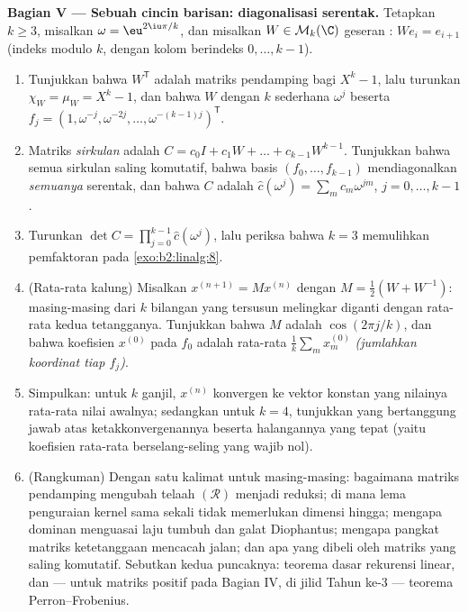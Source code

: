 \begin{problem}
\medskip
\noindent\textbf{Bagian V --- Sebuah cincin barisan: diagonalisasi
serentak.} Tetapkan $k \geq 3$, misalkan $\omega = \eu^{2\iu\pi/k}$,
dan misalkan $W \in \mathcal{M}_k(\C)$ geseran : $W e_i =
e_{i+1}$ (indeks modulo $k$, dengan kolom berindeks $0, \dots, k-1$).
\begin{enumerate}[resume]
  \item Tunjukkan bahwa $W^{\mathsf T}$ adalah matriks pendamping bagi
        $X^k - 1$, lalu turunkan $\chi_W = \mu_W = X^k - 1$, dan bahwa $W$
         dengan $k$  sederhana
        $\omega^j$ beserta  $f_j = (1, \omega^{-j},
        \omega^{-2j}, \dots, \omega^{-(k-1)j})^{\mathsf T}$.
  \item Matriks \emph{sirkulan} adalah $C = c_0 I + c_1 W + \dots
        + c_{k-1}W^{k-1}$. Tunjukkan bahwa semua sirkulan saling
        komutatif, bahwa basis $(f_0, \dots, f_{k-1})$ mendiagonalkan
        \emph{semuanya} serentak, dan bahwa
         $C$ adalah $\widehat c(\omega^j) = \sum_m
        c_m \omega^{jm}$, $j = 0, \dots, k-1$.
  \item Turunkan $\det C = \prod_{j=0}^{k-1} \widehat
        c(\omega^j)$, lalu periksa bahwa $k = 3$ memulihkan
        pemfaktoran pada \cref{exo:b2:linalg:8}.
  \item (Rata-rata kalung) Misalkan $x^{(n+1)} = Mx^{(n)}$ dengan
        $M = \frac12(W + W^{-1})$: masing-masing dari $k$ bilangan yang
        tersusun melingkar diganti dengan rata-rata kedua
        tetangganya. Tunjukkan bahwa  $M$ adalah
        $\cos(2\pi j/k)$, dan bahwa koefisien $x^{(0)}$
        pada $f_0$ adalah rata-rata $\frac1k\sum_m x^{(0)}_m$
        \emph{(jumlahkan koordinat tiap $f_j$)}.
  \item Simpulkan: untuk $k$ ganjil, $x^{(n)}$ konvergen ke
        vektor konstan yang nilainya rata-rata nilai awalnya;
        sedangkan untuk $k = 4$, tunjukkan  yang
        bertanggung jawab atas ketakkonvergenannya beserta halangannya
        yang tepat (yaitu koefisien rata-rata berselang-seling yang wajib nol).
  \item (Rangkuman) Dengan satu kalimat untuk masing-masing: bagaimana
        matriks pendamping mengubah telaah $(\mathcal R)$ menjadi
        reduksi; di mana lema penguraian kernel sama sekali
        tidak memerlukan dimensi hingga; mengapa  dominan
        menguasai laju tumbuh dan galat Diophantus; mengapa pangkat
        matriks ketetanggaan mencacah jalan; dan apa yang dibeli oleh
        matriks yang saling komutatif. Sebutkan kedua puncaknya: teorema
        dasar rekurensi linear, dan --- untuk matriks positif
        pada Bagian IV, di jilid Tahun ke-3 --- teorema Perron--Frobenius.

\end{enumerate}
\end{problem}
